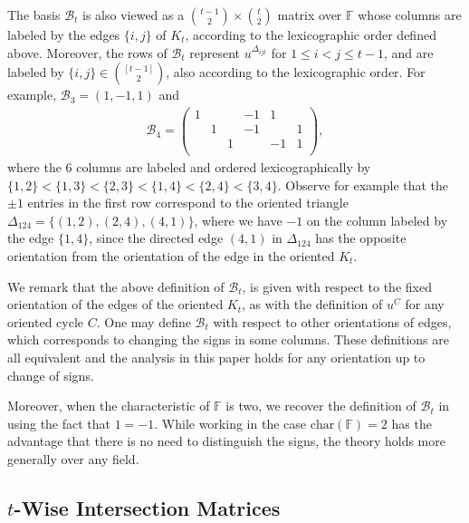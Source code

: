 \documentclass[11pt]{article}
\newcommand\black[1]{{\color{black} #1}}
\begin{document}
The  basis $\mathcal{B}_t$ is also viewed as a $\binom{t-1}{2}\times \binom{t}{2}$ matrix over $\mathbb{F}$ whose columns are labeled
by the edges $\{i,j\}$ of $K_t$, according to the lexicographic order defined above. Moreover, the rows of $\mathcal{B}_t$ represent $u^{\Delta_{ijt}}$ for $1\le i<j\le t-1$, and are labeled by $\{i,j\}\in \binom{[t-1]}{2}$, also according to the lexicographic order. %
For example, $\mathcal{B}_3=(1,-1,1)$ and
\begin{equation}\label{Def-B_4}
  \begin{aligned}
    \mathcal{B}_4=\left(
      \begin{array}{cccccc}
        1 &  &  & -1 & 1 &  \\
         & 1 &  & -1 &  & 1 \\
         &  & 1 &  & -1 & 1 \\
      \end{array}
    \right),
  \end{aligned}
\end{equation}
where the $6$ columns are labeled and ordered lexicographically by  $\{1,2\}<\{1,3\}<\{2,3\}<\{1,4\}<\{2,4\}<\{3,4\}$.
Observe for example that the $\pm 1$ entries in the first row correspond to the oriented triangle $\Delta_{124}=\{(1, 2), (2,4), (4,1)\}$, where we have $-1$ on the column labeled by the edge $\{1,4\}$, since the directed edge $(4,1)$ in $\Delta_{124}$ has the opposite orientation from the  orientation of the edge in \black{the oriented $K_t$}. %


We remark that the above definition of $\mathcal{B}_t$, is  given with respect to the fixed orientation of the edges of \black{the oriented $K_t$},
as with the definition of $u^C$ for any oriented cycle $C$. One may define $\mathcal{B}_t$ with respect to other orientations of edges, which corresponds to changing the signs in some columns. These definitions are all equivalent and the analysis in this paper holds for any orientation up to change of signs.

Moreover, when the characteristic of $\mathbb{F}$ is two,  we recover the definition of $\mathcal{B}_t$  in \cite{shangguan2019combinatorial0} using the fact that $1=-1$. While working in the case $\mathrm{char}(\mathbb{F})=2$ has the advantage that  there is no need to distinguish the signs, the theory holds more generally over any field.



\subsection{$t$-Wise Intersection Matrices}
\end{document}
